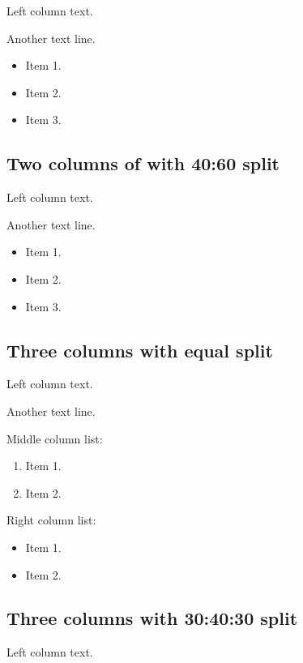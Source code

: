 \documentclass[
  english,
  american,
]{beamer}
\providecommand{\tightlist}{%
  \setlength{\itemsep}{0pt}\setlength{\parskip}{0pt}}
\begin{document}
Left column text.

Another text line.

\begin{itemize}
\tightlist
\item
  Item 1.
\item
  Item 2.
\item
  Item 3.
\end{itemize}

\subsection{Two columns of with 40:60
split}\label{two-columns-of-with-4060-split}

Left column text.

Another text line.

\begin{itemize}
\tightlist
\item
  Item 1.
\item
  Item 2.
\item
  Item 3.
\end{itemize}

\subsection{Three columns with equal
split}\label{three-columns-with-equal-split}

Left column text.

Another text line.

Middle column list:

\begin{enumerate}
\def\labelenumi{\arabic{enumi}.}
\tightlist
\item
  Item 1.
\item
  Item 2.
\end{enumerate}

Right column list:

\begin{itemize}
\tightlist
\item
  Item 1.
\item
  Item 2.
\end{itemize}

\subsection{Three columns with 30:40:30
split}\label{three-columns-with-304030-split}

Left column text.
\end{document}
